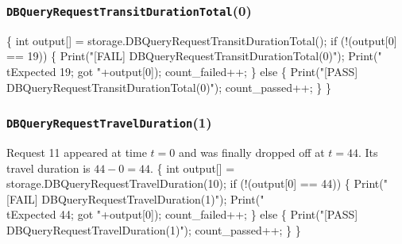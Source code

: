 \documentclass{article}
\def\nwendcode{\endtrivlist \endgroup}
\let\nwdocspar=\par
\begin{document}
\subsubsection{{\tt{}DBQueryRequestTransitDurationTotal}(0)}
\nwenddocs{}\endmoddef{}
\{
  int output[] = storage.DBQueryRequestTransitDurationTotal();
  if (!(output[0] == 19)) \{
    Print("[FAIL] DBQueryRequestTransitDurationTotal(0)");
    Print("\\tExpected 19; got "+output[0]);
    count_failed++;
  \} else \{
    Print("[PASS] DBQueryRequestTransitDurationTotal(0)");
    count_passed++;
  \}
\}
\nwendcode{}\nwdocspar
\subsubsection{{\tt{}DBQueryRequestTravelDuration}(1)}
Request 11 appeared at time $t=0$ and was finally dropped off at $t=44$. Its
travel duration is $44-0=44$.
\nwenddocs{}\endmoddef{}
\{
  int output[] = storage.DBQueryRequestTravelDuration(10);
  if (!(output[0] == 44)) \{
    Print("[FAIL] DBQueryRequestTravelDuration(1)");
    Print("\\tExpected 44; got "+output[0]);
    count_failed++;
  \} else \{
    Print("[PASS] DBQueryRequestTravelDuration(1)");
    count_passed++;
  \}
\}
\nwendcode{}\nwdocspar
\end{document}
